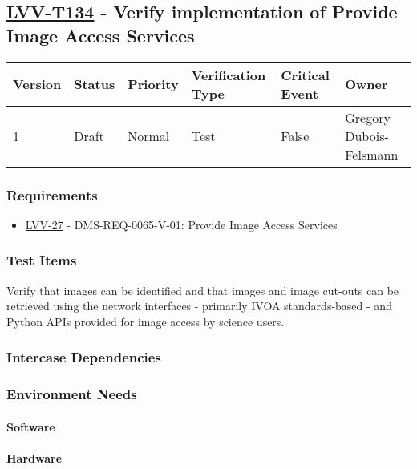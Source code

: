\subsection{\href{https://jira.lsstcorp.org/secure/Tests.jspa\#/testCase/LVV-T134}{LVV-T134}
    - Verify implementation of Provide Image Access Services}\label{lvv-t134}

\begin{longtable}[]{llllll}
\toprule
Version & Status & Priority & Verification Type & Critical Event & Owner
\\\midrule
1 & Draft & Normal &
Test & False & Gregory Dubois-Felsmann
\\\bottomrule
\end{longtable}

\subsubsection{Requirements}
\begin{itemize}
\item \href{https://jira.lsstcorp.org/browse/LVV-27}{LVV-27} - DMS-REQ-0065-V-01: Provide Image Access Services
\end{itemize}

\subsubsection{Test Items}
Verify that images can be identified and that images and image cut-outs
can be retrieved using the network interfaces - primarily IVOA
standards-based - and Python APIs provided for image access by science
users.



\subsubsection{Intercase Dependencies}

\subsubsection{Environment Needs}

\paragraph{Software}

\paragraph{Hardware}

